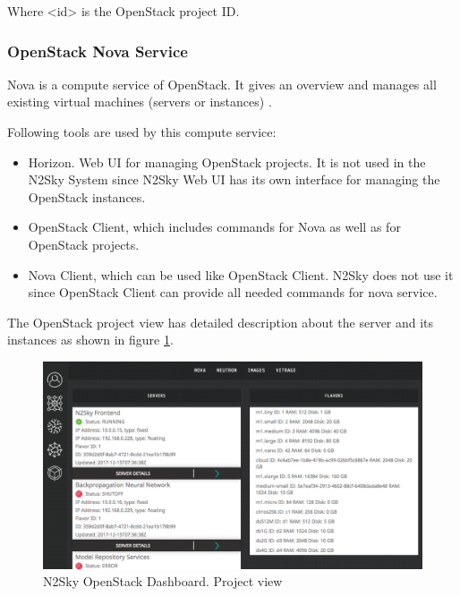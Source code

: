 Where <id> is the OpenStack project ID.

\subsubsection{OpenStack Nova Service}\label{OpenStack Nova Service}

Nova is a compute service of OpenStack. It gives an overview and manages all existing virtual machines (servers or instances) \cite{Markelov2016}. 

Following tools are used by this compute service:
\begin{itemize}
\item Horizon. Web UI for managing OpenStack projects. It is not used in the N2Sky System since N2Sky Web UI has its own interface for managing the OpenStack instances.
\item OpenStack Client, which includes commands for Nova as well as for OpenStack projects.
\item Nova Client, which can be used like OpenStack Client. N2Sky does not use it since OpenStack Client can provide all needed commands for nova service. 
\end{itemize}


The OpenStack project view has detailed description about the server and its instances as shown in figure \ref{fig:openstack_project_view}. 

\begin{figure}[H]
\begin{center}
  \includegraphics[width=\linewidth]{components/4/pics/openstack_project_view.png}
  \caption{N2Sky OpenStack Dashboard. Project view}
  \label{fig:openstack_project_view}
\end{center}
\end{figure}


